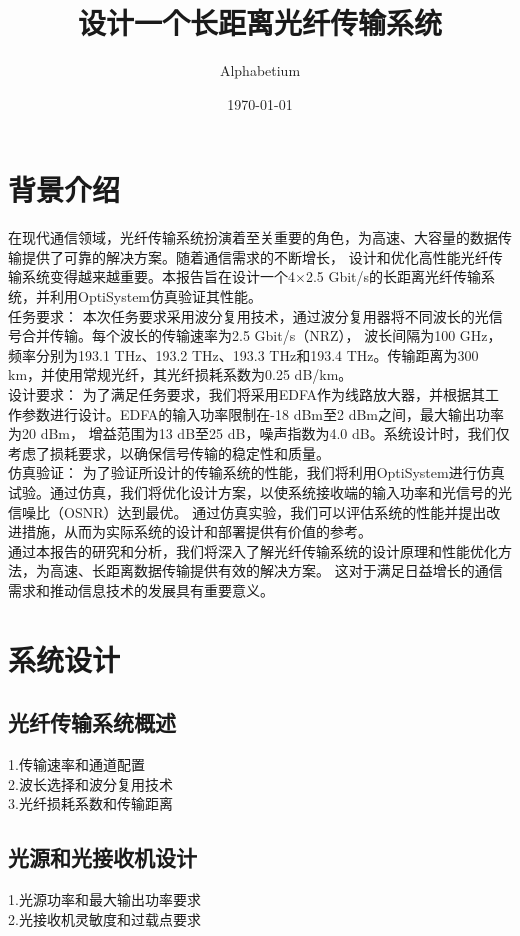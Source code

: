 \documentclass[12pt, a4paper, oneside]{article}
\title{设计一个长距离光纤传输系统}
\date{\today}
\author{Alphabetium}
\begin{document}
\begin{spacing}{2.0}
\tableofcontents
\maketitle


\section{背景介绍}
在现代通信领域，光纤传输系统扮演着至关重要的角色，为高速、大容量的数据传输提供了可靠的解决方案。随着通信需求的不断增长，
设计和优化高性能光纤传输系统变得越来越重要。本报告旨在设计一个4×2.5 Gbit/s的长距离光纤传输系统，并利用OptiSystem仿真验证其性能。
\\
任务要求：
本次任务要求采用波分复用技术，通过波分复用器将不同波长的光信号合并传输。每个波长的传输速率为2.5 Gbit/s（NRZ），
波长间隔为100 GHz，频率分别为193.1 THz、193.2 THz、193.3 THz和193.4 THz。传输距离为300 km，并使用常规光纤，其光纤损耗系数为0.25 dB/km。
\\
设计要求：
为了满足任务要求，我们将采用EDFA作为线路放大器，并根据其工作参数进行设计。EDFA的输入功率限制在-18 dBm至2 dBm之间，最大输出功率为20 dBm，
增益范围为13 dB至25 dB，噪声指数为4.0 dB。系统设计时，我们仅考虑了损耗要求，以确保信号传输的稳定性和质量。
\\
仿真验证：
为了验证所设计的传输系统的性能，我们将利用OptiSystem进行仿真试验。通过仿真，我们将优化设计方案，以使系统接收端的输入功率和光信号的光信噪比（OSNR）达到最优。
通过仿真实验，我们可以评估系统的性能并提出改进措施，从而为实际系统的设计和部署提供有价值的参考。
\\
通过本报告的研究和分析，我们将深入了解光纤传输系统的设计原理和性能优化方法，为高速、长距离数据传输提供有效的解决方案。
这对于满足日益增长的通信需求和推动信息技术的发展具有重要意义。

\section{系统设计}
\subsection{光纤传输系统概述}
1.传输速率和通道配置\\
2.波长选择和波分复用技术\\
3.光纤损耗系数和传输距离\\
\subsection{光源和光接收机设计}
1.光源功率和最大输出功率要求\\
2.光接收机灵敏度和过载点要求\\



\end{spacing}
\end{document}
